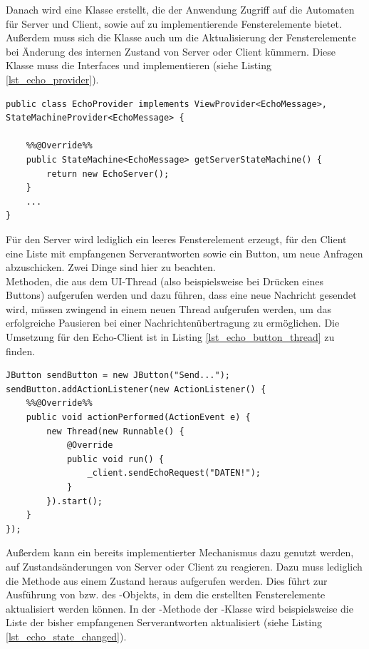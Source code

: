 Danach wird eine Klasse  erstellt, die der Anwendung Zugriff auf die Automaten für Server und Client, sowie auf zu implementierende Fensterelemente bietet. Außerdem muss sich die Klasse auch um die Aktualisierung der Fensterelemente bei Änderung des internen Zustand von Server oder Client kümmern. Diese Klasse muss die Interfaces  und  implementieren (siehe Listing \ref{lst_echo_provider}).

\begin{lstlisting}[style=java, caption={Implementierung der \sourceobject{EchoProvider}-Klasse}, label=lst_echo_provider]
public class EchoProvider implements ViewProvider<EchoMessage>, StateMachineProvider<EchoMessage> {

	%%@Override%%
	public StateMachine<EchoMessage> getServerStateMachine() {
		return new EchoServer();
	}
	...
}
\end{lstlisting}

Für den Server wird lediglich ein leeres Fensterelement erzeugt, für den Client eine Liste mit empfangenen Serverantworten sowie ein Button, um neue Anfragen abzuschicken. Zwei Dinge sind hier zu beachten.\\
Methoden, die aus dem UI-Thread (also beispielsweise bei Drücken eines Buttons) aufgerufen werden und dazu führen, dass eine neue Nachricht gesendet wird, müssen zwingend in einem neuen Thread aufgerufen werden, um das erfolgreiche Pausieren bei einer Nachrichtenübertragung zu ermöglichen. Die Umsetzung für den Echo-Client ist in Listing \ref{lst_echo_button_thread} zu finden.

\begin{lstlisting}
JButton sendButton = new JButton("Send...");
sendButton.addActionListener(new ActionListener() {
	%%@Override%%
	public void actionPerformed(ActionEvent e) {
		new Thread(new Runnable() {
			@Override
			public void run() {
				_client.sendEchoRequest("DATEN!");
			}
		}).start();
	}
});
\end{lstlisting}

Außerdem kann ein bereits implementierter Mechanismus dazu genutzt werden, auf Zustandsänderungen von Server oder Client zu reagieren. Dazu muss lediglich die Methode  aus einem Zustand heraus aufgerufen werden. Dies führt zur Ausführung von  bzw.  des -Objekts, in dem die erstellten Fensterelemente aktualisiert werden können. In der -Methode der -Klasse wird beispielsweise die Liste der bisher empfangenen Serverantworten aktualisiert (siehe Listing \ref{lst_echo_state_changed}).

